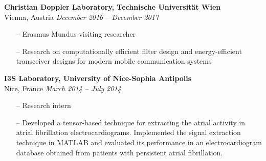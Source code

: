 {\bf Christian Doppler Laboratory, Technische Universit\"at Wien}\\
Vienna, Austria \hfill {\it December 2016 -- December 2017} \\
\begin{itemize}
	\item[--] Erasmus Mundus visiting researcher 
	\item[--] Research on computationally efficient filter design and energy-efficient transceiver designs for modern mobile communication systems
\end{itemize}

{\bf I3S Laboratory, University of Nice-Sophia Antipolis}\\
Nice, France \hfill  {\it March 2014 -- July 2014} \\
\begin{itemize}
	\item[--] Research intern
	\item[--] Developed a tensor-based technique for extracting the atrial activity in atrial fibrillation electrocardiograms. Implemented the signal extraction technique in MATLAB and evaluated its performance in an electrocardiogram database obtained from patients with persistent atrial fibrillation.
\end{itemize}
